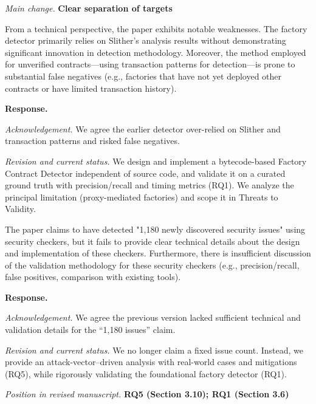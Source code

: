 \documentclass[acmsmall]{acmart}
\begin{document}
	\textit{Main change.} {\color{blue}\textbf{Clear separation of targets}}

	\begin{tcolorbox}
		[commentbox,title=Reviewer \#3 -- Comment 3] From a technical perspective, the paper
		exhibits notable weaknesses. The factory detector primarily relies on Slither's analysis results
		without demonstrating significant innovation in detection methodology. Moreover, the method employed
		for unverified contracts—using transaction patterns for detection—is prone to substantial false
		negatives (e.g., factories that have not yet deployed other contracts or have limited
		transaction history).
	\end{tcolorbox}

	\noindent
	\textbf{Response.}

	\textit{Acknowledgement.} We agree the earlier detector over-relied on Slither and transaction
	patterns and risked false negatives.

	\textit{Revision and current status.} We design and implement a bytecode-based Factory Contract Detector
	independent of source code, and validate it on a curated ground truth with precision/recall and
	timing metrics (RQ1). We analyze the principal limitation (proxy-mediated factories) and scope it
	in Threats to Validity.

	\begin{tcolorbox}
		[commentbox,title=Reviewer \#3 -- Comment 4] The paper claims to have detected "1,180 newly
		discovered security issues" using security checkers, but it fails to provide clear technical
		details about the design and implementation of these checkers. Furthermore, there is
		insufficient discussion of the validation methodology for these security checkers (e.g., precision/recall,
		false positives, comparison with existing tools).
	\end{tcolorbox}

	\noindent
	\textbf{Response.}

	\textit{Acknowledgement.} We agree the previous version lacked sufficient technical and validation
	details for the “1,180 issues” claim.

	\textit{Revision and current status.} We no longer claim a fixed issue count. Instead, we
	provide an attack-vector–driven analysis with real-world cases and mitigations (RQ5), while rigorously
	validating the foundational factory detector (RQ1).

	\textit{Position in revised manuscript.}
	{\color{red}\textbf{RQ5 (Section 3.10); RQ1 (Section 3.6)}}
\end{document}
